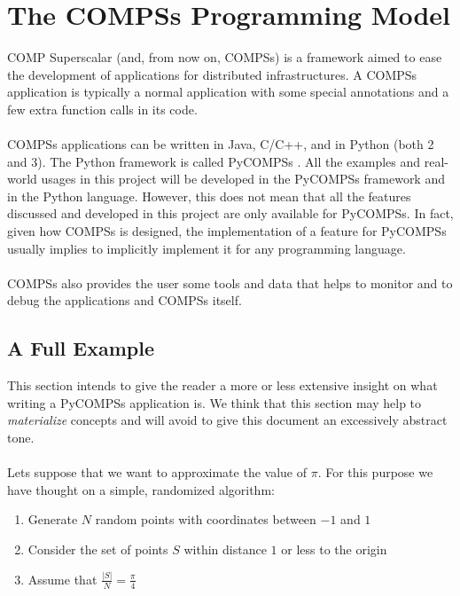 \section{The COMPSs Programming Model}
\label{sec:compss}
COMP Superscalar \cite{compss} (and, from now on, COMPSs) is a framework aimed to ease the development of applications for distributed infrastructures. A COMPSs application is typically a normal application with some special annotations and a few extra function calls in its code.\\
\\
COMPSs applications can be written in Java, C/C++, and in Python (both 2 and 3). The Python framework is called PyCOMPSs \cite{pycompss}. All the examples and real-world usages in this project will be developed in the PyCOMPSs framework and in the Python language. However, this does not mean that all the features discussed and developed in this project are only available for PyCOMPSs. In fact, given how COMPSs is designed, the implementation of a feature for PyCOMPSs usually implies to implicitly implement it for any programming language.\\
\\
COMPSs also provides the user some tools and data that helps to monitor and to debug the applications and COMPSs itself.

\subsection{A Full Example}
\label{subsec:compss_example}
This section intends to give the reader a more or less extensive insight on what writing a PyCOMPSs application is. We think that this section may help to \textit{materialize} concepts and will avoid to give this document an excessively abstract tone.\\
\\
Lets suppose that we want to approximate the value of $\pi$. For this purpose we have thought on a simple, randomized algorithm:
\begin{enumerate}
\item Generate $N$ random points with coordinates between $-1$ and $1$
\item Consider the set of points $S$ within distance $1$ or less to the origin
\item Assume that $\frac{|S|}{N} = \frac{\pi}{4}$
\end{enumerate}

